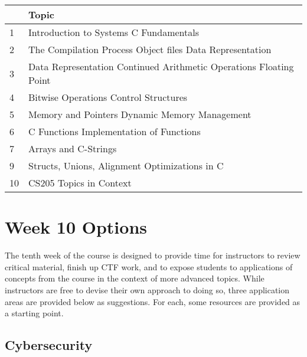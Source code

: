 \documentclass[12pt,letterpaper]{article}
\begin{document}
	\begin{longtable}{| p{0.5in} | p{6in} |} \hline
		\rowcolor{lightgray}{\bf Wk} & {\bf Topic} \\ \hline \endhead
		
		1 & Introduction to Systems \newline C Fundamentals  \\ \hline
		2 & The Compilation Process \newline Object files \newline Data Representation  \\ \hline
		3 & Data Representation Continued  \newline  Arithmetic Operations  \newline Floating Point \\ \hline
		4 & Bitwise Operations \newline  Control Structures  \\ \hline
		5 & Memory and Pointers  \newline  Dynamic Memory Management \\ \hline
		6 & C Functions \newline  Implementation of Functions  \\ \hline
		7 & Arrays and C-Strings \\ \hline
		9 & Structs, Unions, Alignment  \newline Optimizations in C  \\ \hline
		10 & CS205 Topics in Context  \\ \hline
	\end{longtable}

	\clearpage
	\section{Week 10 Options}

	The tenth week of the course is designed to provide time for instructors to review critical material, finish up CTF work, and to expose students to applications of concepts from the course in the context of more advanced topics. While instructors are free to devise their own approach to doing so, three application areas are provided below as suggestions. For each, some resources are provided as a starting point.


	\subsection{Cybersecurity}
\end{document}

